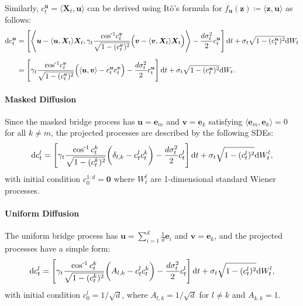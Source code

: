 Similarly, $c^{\bm{u}}_t = \langle\bm{X}_t, \bm{u}\rangle$ can be derived using It\^{o}'s formula for $f_{\bm{u}}(\bm{z})\coloneqq \langle \bm{z}, \bm{u} \rangle$ as follows:
\begin{align}
    \mathrm{d}c^{\bm{u}}_t 
    &= \left[ 
        \left\langle 
            \bm{u} - \langle\bm{u}, \bm{X}_t\rangle\bm{X}_t, 
            \gamma_t \frac{\invcos\! c^{\bm{v}}_t}{\sqrt{1 - (c^{\bm{v}}_t)^2}} \Big(\bm{v} - \langle\bm{v}, \bm{X}_t\rangle\bm{X}_t \Big) 
        \right\rangle 
        - \frac{d\sigma_t^2}{2}c^{\bm{u}}_t
    \right]\mathrm{d}t + \sigma_t\sqrt{1 - (c^{\bm{u}}_t)^2}\mathrm{d}W_t \\[6pt]
    &= \left[
        \gamma_t \frac{\invcos\! c^{\bm{v}}_t}{\sqrt{1 - (c^{\bm{v}}_t)^2}} 
        \Big(\langle\bm{u},\bm{v}\rangle - c^{\bm{u}}_t c^{\bm{v}}_t \Big)
        -\frac{d\sigma_t^2}{2}c^{\bm{u}}_t
    \right]\mathrm{d}t 
    + \sigma_t\sqrt{1 - (c^{\bm{u}}_t)^2}\mathrm{d}W_t.
\end{align}



\paragraph{Masked Diffusion}
Since the masked bridge process has $\bm{u}=\bm{e}_m$ and $\bm{v}=\bm{e}_k$ satisfying $\langle \bm{e}_m, \bm{e}_k\rangle=0$ for all $k\neq m$, the projected processes are described by the following SDEs:
\begin{align}
\mathrm{d}c^l_t = \left[ \gamma_t
    \frac{\invcos c^{k}_t}{\sqrt{1 - (c^{k}_t)^2}} \bigg( \delta_{l,k} - c^{l}_t c^{k}_t \bigg) -\frac{d\sigma_t^2}{2}c^{l}_t 
\right]\mathrm{d}t + \sigma_t\sqrt{1 - (c^{l}_t)^2}\mathrm{d}W^l_t,
\end{align}
with initial condition $c^{1:d}_0 = \bm{0}$ where $W^l_t$ are 1-dimensional standard Wiener processes.

\paragraph{Uniform Diffusion}
The uniform bridge process has $\bm{u}=\sum^{d}_{i=1} \frac{1}{d}\bm{e}_i$ and $\bm{v}=\bm{e}_k$, and the projected processes have a simple form:
\begin{align}
\mathrm{d}c^l_t = \left[ \gamma_t
    \frac{\invcos c^{k}_t}{\sqrt{1 - (c^{k}_t)^2}} \bigg( A_{l,k} - c^{l}_t c^{k}_t \bigg) -\frac{d\sigma_t^2}{2}c^{l}_t 
\right]\mathrm{d}t + \sigma_t\sqrt{1 - (c^{l}_t)^2}\mathrm{d}W^l_t,
\end{align}
with initial condition $c^{l}_0 = 1/\sqrt{d}$, where $A_{l,k} = 1/\sqrt{d}$ for $l\neq k$ and $A_{k,k}=1$. 



